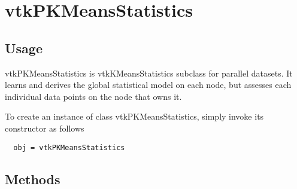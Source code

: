 \section{vtkPKMeansStatistics}

\subsection{Usage}

 vtkPKMeansStatistics is vtkKMeansStatistics subclass for parallel datasets.
 It learns and derives the global statistical model on each node, but assesses each 
 individual data points on the node that owns it.

To create an instance of class vtkPKMeansStatistics, simply
invoke its constructor as follows
\begin{verbatim}
  obj = vtkPKMeansStatistics
\end{verbatim}
\subsection{Methods}

